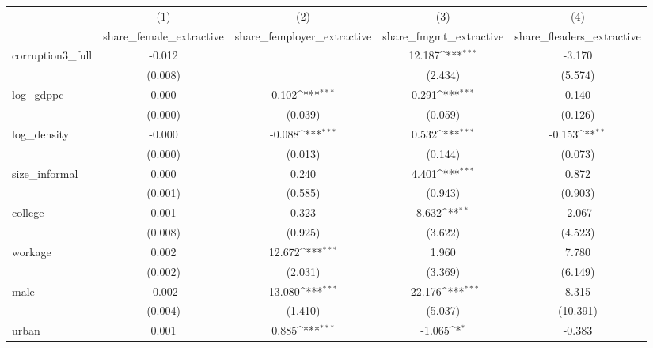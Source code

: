 {
\def\sym#1{\ifmmode^{#1}\else\(^{#1}\)\fi}
\begin{tabular}{l*{4}{c}}
\hline\hline
            &\multicolumn{1}{c}{(1)}&\multicolumn{1}{c}{(2)}&\multicolumn{1}{c}{(3)}&\multicolumn{1}{c}{(4)}\\
            &\multicolumn{1}{c}{share\_female\_extractive}&\multicolumn{1}{c}{share\_femployer\_extractive}&\multicolumn{1}{c}{share\_fmgmt\_extractive}&\multicolumn{1}{c}{share\_fleaders\_extractive}\\
\hline
corruption3\_full&      -0.012         &                     &      12.187\sym{***}&      -3.170         \\
            &     (0.008)         &                     &     (2.434)         &     (5.574)         \\
[1em]
log\_gdppc   &       0.000         &       0.102\sym{***}&       0.291\sym{***}&       0.140         \\
            &     (0.000)         &     (0.039)         &     (0.059)         &     (0.126)         \\
[1em]
log\_density &      -0.000         &      -0.088\sym{***}&       0.532\sym{***}&      -0.153\sym{**} \\
            &     (0.000)         &     (0.013)         &     (0.144)         &     (0.073)         \\
[1em]
size\_informal&       0.000         &       0.240         &       4.401\sym{***}&       0.872         \\
            &     (0.001)         &     (0.585)         &     (0.943)         &     (0.903)         \\
[1em]
college     &       0.001         &       0.323         &       8.632\sym{**} &      -2.067         \\
            &     (0.008)         &     (0.925)         &     (3.622)         &     (4.523)         \\
[1em]
workage     &       0.002         &      12.672\sym{***}&       1.960         &       7.780         \\
            &     (0.002)         &     (2.031)         &     (3.369)         &     (6.149)         \\
[1em]
male        &      -0.002         &      13.080\sym{***}&     -22.176\sym{***}&       8.315         \\
            &     (0.004)         &     (1.410)         &     (5.037)         &    (10.391)         \\
[1em]
urban       &       0.001         &       0.885\sym{***}&      -1.065\sym{*}  &      -0.383         \\

\end{tabular}}
